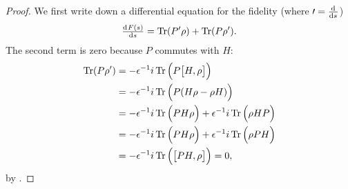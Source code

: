\begin{proof}
We first write down a differential equation for the fidelity (where $\prime = \od{}{s}$)
\[ \od{F(s)}{s} = \Tr(P'\rho) + \Tr(P\rho'). \]
The second term is zero because $P$ commutes with $H$:
\begin{align*}
\operatorname{Tr}(P\rho') &= -\epsilon^{-1}i\operatorname{Tr}\Big(P\big[H, \rho\big]\Big) \\
&= -\epsilon^{-1}i\operatorname{Tr}\Big(P(H\rho - \rho H)\Big) \\
&= -\epsilon^{-1}i\operatorname{Tr}\Big(PH\rho\Big) +\epsilon^{-1}i\operatorname{Tr}\Big(\rho HP\Big) \\
&= -\epsilon^{-1}i\operatorname{Tr}\Big(PH\rho\Big) +\epsilon^{-1}i\operatorname{Tr}\Big(\rho PH\Big) \\
&= -\epsilon^{-1}i\operatorname{Tr}\Big(\big[PH, \rho\big]\Big) = 0,
\end{align*}
by .


\end{proof}
